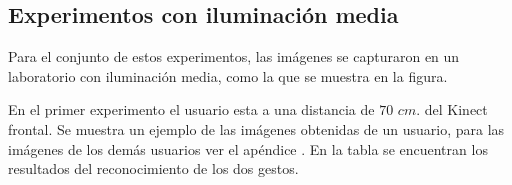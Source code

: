 \subsection{Experimentos con iluminación media} 
Para el conjunto de estos experimentos, las imágenes se capturaron en un laboratorio con iluminación media, como la que se muestra en la figura.

En el primer experimento el usuario esta a una distancia de $70$ $cm.$ del Kinect frontal. Se muestra un ejemplo de las imágenes obtenidas de un usuario, para las imágenes de los demás usuarios ver el apéndice . En la tabla se encuentran los resultados del reconocimiento de los dos gestos.  

\begin{figure}[h!]
\centering
{}

\end{figure}
